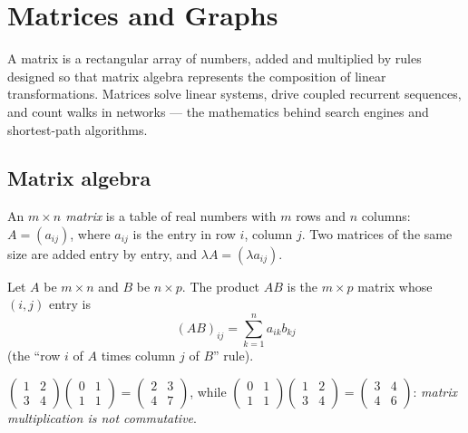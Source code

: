 \chapter{Matrices and Graphs}\label{ch:tle:matrix}

A matrix is a rectangular array of numbers, added and multiplied by rules
designed so that matrix algebra represents the composition of linear
transformations. Matrices solve linear systems, drive coupled recurrent
sequences, and count walks in networks --- the mathematics behind search
engines and shortest-path algorithms.

\section{Matrix algebra}

\begin{definition}[Matrix]\label{def:tle:matrix:matrix}
An \emph{$m \times n$ matrix} is a table of real numbers with
$m$ rows and $n$ columns:
$A = (a_{ij})$, where $a_{ij}$ is the entry in row $i$, column $j$.
Two matrices of the same size are added entry by entry, and
$\lambda A = (\lambda a_{ij})$.
\end{definition}

\begin{definition}\label{def:tle:matrix:product}
Let $A$ be $m \times n$ and $B$ be $n \times p$. The product $AB$ is the
$m \times p$ matrix whose $(i,j)$ entry is
\[
(AB)_{ij} = \sum_{k=1}^{n} a_{ik} b_{kj}
\]
(the ``row $i$ of $A$ times column $j$ of $B$'' rule).
\end{definition}

\begin{example}
$\begin{pmatrix} 1 & 2\\ 3 & 4\end{pmatrix}
\begin{pmatrix} 0 & 1\\ 1 & 1\end{pmatrix}
= \begin{pmatrix} 2 & 3\\ 4 & 7\end{pmatrix}$,
\quad while \quad
$\begin{pmatrix} 0 & 1\\ 1 & 1\end{pmatrix}
\begin{pmatrix} 1 & 2\\ 3 & 4\end{pmatrix}
= \begin{pmatrix} 3 & 4\\ 4 & 6\end{pmatrix}$:
\emph{matrix multiplication is not commutative}.
\end{example}

